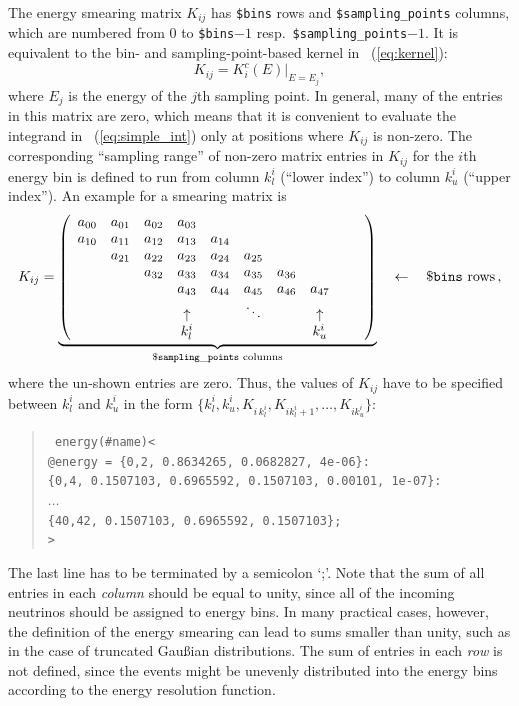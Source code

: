 The energy smearing matrix $K_{ij}$ has {\tt \$bins} rows and {\tt \$sampling\_points} columns, which are numbered from $0$ to {\tt \$bins}$-1$ resp.\ {\tt \$sampling\_points}$-1$. It is equivalent to the 
bin- and sampling-point-based kernel in \eq~(\ref{eq:kernel}):
\begin{equation}
K_{ij} = K_i^c(E) |_{E=E_j},
\label{equ:ematrix}
\end{equation}
where $E_j$ is the energy of the $j$th sampling point. In general, many of the entries in this matrix are zero, which means that it is convenient to evaluate the integrand in \eq~(\ref{eq:simple_int}) only at positions where
$K_{ij}$ is non-zero. The corresponding ``sampling range'' of non-zero matrix entries  in $K_{ij}$ for the $i$th energy bin is defined to run from
column $k_l^i$ (``lower index'') to column $k_u^i$ (``upper index'').
An example for a smearing matrix is
\begin{equation}
K_{ij} =   \underbrace{ \left( \begin{array}{cccccccccc} 
a_{00} & a_{01} & a_{02} & a_{03} &  &  &  &  &  & \\
a_{10} & a_{11} & a_{12} & a_{13} & a_{14} &  &  &  &  &  \\
 & a_{21} & a_{22} & a_{23} & a_{24} & a_{25} &  &  &  &  \\
 &  & a_{32} & a_{33} & a_{34} & a_{35} & a_{36} &  &  &  \\
 &  &  & a_{43} & a_{44} & a_{45} & a_{46} & a_{47} &  &  \\
& & & \uparrow  & & \ddots & & \uparrow & & \\
& & & k_l^i & & & & k_u^i & & \\ 
\end{array}\right) }_{\mathtt{\$sampling\_points}  \, \, \mathrm{columns}} \quad \leftarrow \quad \footnotesize{\mathtt{\$bins} \, \, \mathrm{rows}} \, ,
\end{equation}
where the un-shown entries are zero. Thus, the values of $K_{ij}$ have to be specified between $k_l^i$ and $k_u^i$ in the form $\{ k_l^i,k_u^i, K_{i \, k_l^i}, K_{i k_l^i+1} , \hdots , K_{i k_u^i} \}$:
\begin{quote}
{\tt 
energy(\#name)<\\
\tb @energy =   \{0,2, 0.8634265, 0.0682827,     4e-06\}:\\
\tb\tb \{0,4, 0.1507103, 0.6965592, 0.1507103,   0.00101,     1e-07\}:\\
\tb\tb $\ldots$\\
\tb\tb \{40,42, 0.1507103, 0.6965592, 0.1507103\};\\
>
}
\end{quote}
The last line has to be terminated by a semicolon `;'.
Note that the sum of all entries in each {\em column} should be equal 
to unity,
since all of the incoming neutrinos should be assigned to energy bins. In many practical cases, however, the definition of the energy smearing can
lead to sums smaller than unity, such as in the case of truncated Gau\ss ian
distributions. The sum of entries in each {\em row} is not defined, since the events might be unevenly distributed into the energy bins
according to the energy resolution function.

